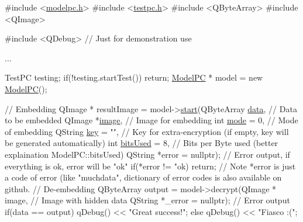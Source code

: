 \begin{DoxyCode}
\textcolor{preprocessor}{#include <\mbox{\hyperlink{modelpc_8h}{modelpc.h}}>}
\textcolor{preprocessor}{#include <\mbox{\hyperlink{testpc_8h}{testpc.h}}>}
\textcolor{preprocessor}{#include <QByteArray>}
\textcolor{preprocessor}{#include <QImage>}

\textcolor{preprocessor}{#include <QDebug>} \textcolor{comment}{// Just for demonstration use}

...

TestPC testing;
\textcolor{keywordflow}{if}(!testing.startTest())
    \textcolor{keywordflow}{return};
\mbox{\hyperlink{class_model_p_c}{ModelPC}} * model = \textcolor{keyword}{new} \mbox{\hyperlink{class_model_p_c}{ModelPC}}();

\textcolor{comment}{// Embedding}
QImage * resultImage = model->\mbox{\hyperlink{class_model_p_c_a3cae34fd5bcb06e8c1f8cfe7961bd270}{start}}(QByteArray \mbox{\hyperlink{namespace_errors_dict_setup_af570460846fb9f0c91abd308a095dcdc}{data}}, \textcolor{comment}{// Data to be embedded}
                                    QImage *\mbox{\hyperlink{namespacetests-setup_ad55b685280f549e15688a94cbb89f512}{image}}, \textcolor{comment}{// Image for embedding}
                                    \textcolor{keywordtype}{int} \mbox{\hyperlink{namespacetests-setup_a04126d10edec6b3171e1b55a00309b23}{mode}} = 0, \textcolor{comment}{// Mode of embedding}
                                    QString \mbox{\hyperlink{namespace_errors_dict_setup_a09c268098d09ffb8e5504f30fa6d5dd9}{key}} = \textcolor{stringliteral}{""}, \textcolor{comment}{// Key for extra-encryption (if empty, key will be
       generated automatically)}
                                    \textcolor{keywordtype}{int} \mbox{\hyperlink{namespacetests-setup_a64974eb034f518d24195739395783d3d}{bitsUsed}} = 8, \textcolor{comment}{// Bits per Byte used (better explaination
       ModelPC::bitsUsed)}
                                    QString *error = \textcolor{keyword}{nullptr}); \textcolor{comment}{// Error output, if everything is ok, error
       will be "ok"}
\textcolor{keywordflow}{if}(*error != \textcolor{stringliteral}{"ok)}
\textcolor{stringliteral}{    return;}
\textcolor{stringliteral}{// Note *error is just a code of error (like "}muchdata\textcolor{stringliteral}{", dictionary of error codes is also available on
       github.}
\textcolor{stringliteral}{}
\textcolor{stringliteral}{// De-embedding}
\textcolor{stringliteral}{QByteArray output = model->decrypt(QImage * image, // Image with hidden data}
\textcolor{stringliteral}{                                   QString *\_error = nullptr); // Error output}
\textcolor{stringliteral}{if(data == output)}
\textcolor{stringliteral}{   qDebug() << "}Great success!\textcolor{stringliteral}{";}
\textcolor{stringliteral}{else}
\textcolor{stringliteral}{   qDebug() << "}Fiasco :(\textcolor{stringliteral}{";}
\end{DoxyCode}
